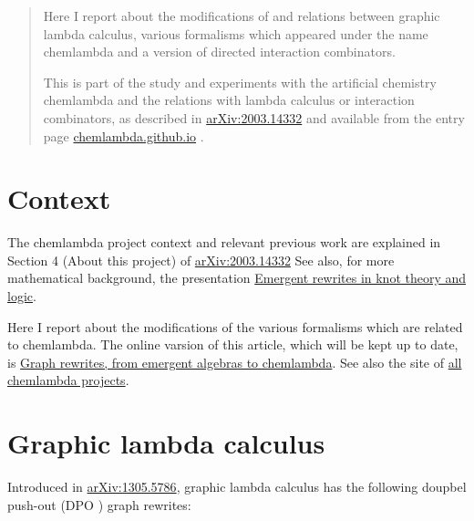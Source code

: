 \documentclass{article}
\begin{document}
\maketitle


\begin{abstract}
Here I report about the modifications of and relations between graphic lambda calculus,  various formalisms which appeared under the name chemlambda and a version of directed interaction combinators.

This is part of the study and experiments with the artificial chemistry chemlambda and the relations with lambda calculus or interaction combinators, as described in \href{https://arxiv.org/abs/2003.14332}{arXiv:2003.14332} and available from the entry page \href{https://chemlambda.github.io/index.html}{chemlambda.github.io} \cite{entry}.
\end{abstract}
\vspace{.5cm}


\section*{Context}
The chemlambda project context and relevant previous work are explained in Section 4 (About this project) of \cite{buligachemlambda} \href{https://arxiv.org/abs/2003.14332}{arXiv:2003.14332}  See also, for more mathematical background, the presentation \cite{buliganovo} \href{https://mbuliga.github.io/novo/presentation.html}{Emergent rewrites in knot theory and logic}.



 Here I report about the modifications of the various formalisms which are related to chemlambda.   The online varsion of this article, which will be kept up to date, is \href{https://mbuliga.github.io/quinegraphs/history-of-chemlambda.html}{Graph rewrites, from emergent algebras to chemlambda}. See also the site of \href{https://chemlambda.github.io/index.html}{all chemlambda projects}.


\tableofcontents

\section{Graphic lambda calculus}
\label{GraphicLambdaCalculus}
Introduced in \cite{buligaglc}  \href{https://arxiv.org/abs/1305.5786}{arXiv:1305.5786}, graphic lambda calculus  has the following doupbel push-out (DPO \cite{dpo}) graph rewrites:
\vspace{.5cm}
 
\end{document}
